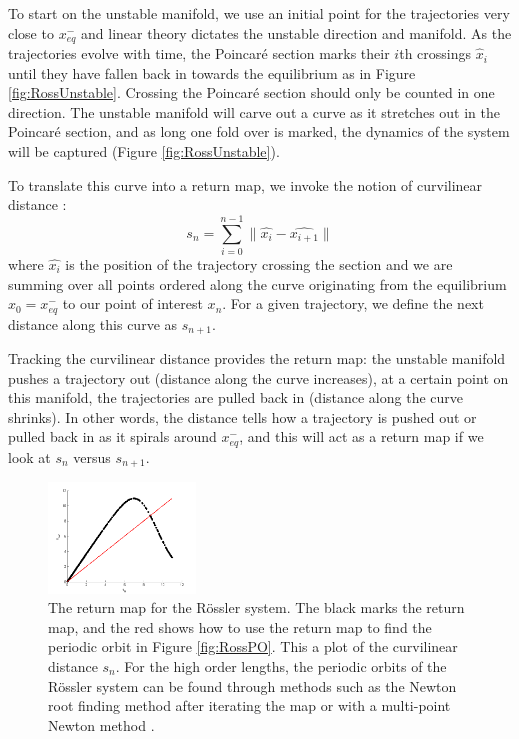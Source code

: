 \documentclass[12 pt]{article}
\begin{document}
To start on the unstable manifold, we use an initial point for the trajectories very close to $x_{eq}^{-}$ and linear theory dictates the unstable direction and manifold.  As the trajectories evolve with time, the Poincar\'e section marks their $i$th crossings $\hat{x}_i$ until they have fallen back in towards the equilibrium as in Figure \ref{fig:RossUnstable}.  Crossing the Poincar\'e section should only be counted in one direction.  The unstable manifold will carve out a curve as it stretches out in the Poincar\'e section, and as long one fold over is marked, the dynamics of the system will be captured (Figure \ref{fig:RossUnstable}).

To translate this curve into a return map, we invoke the notion of curvilinear distance \cite{SRetMap}:
\begin{equation}
 s_n = \sum_{i = 0}^{n-1} \parallel \hat{x_i} - \hat{x_{i+1}} \parallel
 \label{eq:CurveDis}
\end{equation}
where $\hat{x_i}$ is the position of the trajectory crossing the section and we are summing over all points ordered along the curve originating from the equilibrium $x_0 = x_{eq}^{-}$ to our point of interest $x_n$.  For a given trajectory, we define the next distance along this curve as $s_{n+1}$.

Tracking the curvilinear distance provides the return map: the unstable manifold pushes a trajectory out (distance along the curve increases), at a certain point on this manifold, the trajectories are pulled back in (distance along the curve shrinks).  In other words, the distance tells how a trajectory is pushed out or pulled back in as it spirals around $x_{eq}^{-}$, and this will act as a return map if we look at $s_n$ versus $s_{n+1}$.
\begin{figure}[h]
\centering
  \includegraphics[width=0.35\textwidth]{Figs/Section1/kcrosslerretmap.png}
\caption{
 The return map for the R\"ossler system.  The black marks the return map, and the red shows how to use the return map to find the periodic orbit in Figure \ref{fig:RossPO}.  This a plot of the curvilinear distance $s_n$.  For the high order lengths, the periodic orbits of the R\"ossler system can be found through methods such as the Newton root finding method after iterating the map or with a multi-point Newton method \cite{CB}.
}
 \label{fig:RossRetmap}
\end{figure}
\end{document}
